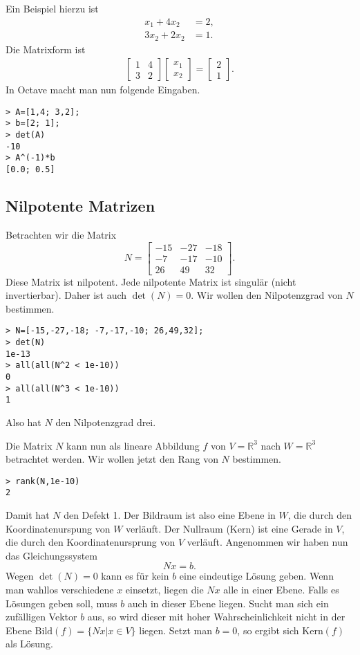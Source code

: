 \documentclass[a4paper,11pt,fleqn]{article}
\begin{document}
Ein Beispiel hierzu ist
\begin{align*}
x_1+4x_2 &= 2,\\
3x_2+2x_2 &=1.
\end{align*}
Die Matrixform ist
\begin{gather*}
\begin{bmatrix}
1 & 4\\
3 & 2
\end{bmatrix}
\begin{bmatrix}
x_1\\ x_2
\end{bmatrix}
= \begin{bmatrix}
2\\ 1
\end{bmatrix}.
\end{gather*}
In Octave macht man nun folgende Eingaben.
\begin{verbatim}
> A=[1,4; 3,2];
> b=[2; 1];
> det(A)
-10
> A^(-1)*b
[0.0; 0.5]
\end{verbatim}

\subsection{Nilpotente Matrizen}

Betrachten wir die Matrix
\[N=\begin{bmatrix}
-15 & -27 & -18\\
 -7 & -17 & -10\\
 26 &  49 &  32
\end{bmatrix}.\]
Diese Matrix ist nilpotent. Jede nilpotente Matrix ist singulär
(nicht invertierbar). Daher ist auch \(\det(N)=0\). Wir wollen
den Nilpotenzgrad von \(N\) bestimmen.
\begin{verbatim}
> N=[-15,-27,-18; -7,-17,-10; 26,49,32];
> det(N)
1e-13
> all(all(N^2 < 1e-10))
0
> all(all(N^3 < 1e-10))
1
\end{verbatim}
Also hat \(N\) den Nilpotenzgrad drei.

Die Matrix \(N\) kann nun als lineare Abbildung \(f\) von
\(V=\mathbb R^3\) nach \(W=\mathbb R^3\) betrachtet werden. Wir
wollen jetzt den Rang von \(N\) bestimmen.
\begin{verbatim}
> rank(N,1e-10)
2
\end{verbatim}
Damit hat \(N\) den Defekt 1. Der Bildraum ist also eine Ebene in
\(W\), die durch den Koordinatenurspung von \(W\) verläuft. Der
Nullraum (Kern) ist eine Gerade in \(V\), die durch den
Koordinatenursprung von \(V\) verläuft. Angenommen wir haben nun das
Gleichungssystem
\[Nx=b.\]
Wegen \(\det(N)=0\) kann es für kein \(b\) eine eindeutige Lösung
geben. Wenn man wahllos verschiedene \(x\) einsetzt, liegen die
\(Nx\) alle in einer Ebene. Falls es Lösungen geben soll, muss
\(b\) auch in dieser Ebene liegen. Sucht man sich ein zufälligen
Vektor \(b\) aus, so wird dieser mit hoher Wahrscheinlichkeit nicht
in der Ebene \(\mathrm{Bild}(f)=\{Nx|x\in V\}\) liegen. Setzt man
\(b=0\), so ergibt sich \(\mathrm{Kern}(f)\) als Lösung. 
\end{document}
